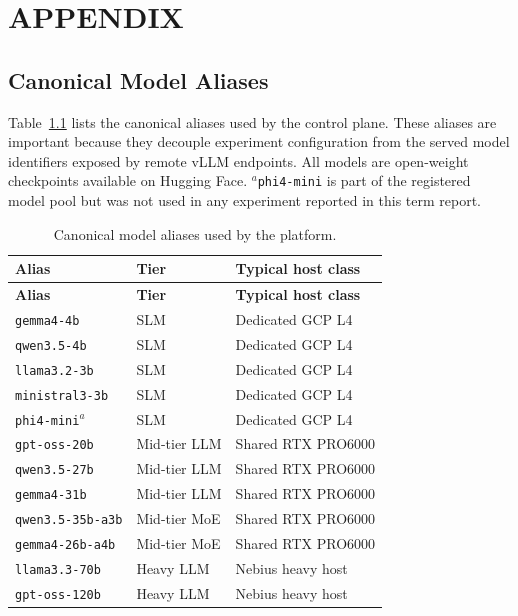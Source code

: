 \appendix
\chapter{APPENDIX}

\section{Canonical Model Aliases}

Table~\ref{tab:appendix-aliases} lists the canonical aliases used by the control plane. These aliases are important because they decouple experiment configuration from the served model identifiers exposed by remote vLLM endpoints. All models are open-weight checkpoints available on Hugging Face. ${}^{a}$\texttt{phi4-mini} is part of the registered model pool but was not used in any experiment reported in this term report.

\begin{longtable}{@{} l l l @{}}
    \caption{Canonical model aliases used by the platform.}
    \label{tab:appendix-aliases} \\
    \toprule
    \textbf{Alias} & \textbf{Tier} & \textbf{Typical host class} \\
    \midrule
    \endfirsthead
    \toprule
    \textbf{Alias} & \textbf{Tier} & \textbf{Typical host class} \\
    \midrule
    \endhead
    \texttt{gemma4-4b} & SLM & Dedicated GCP L4 \\
    \texttt{qwen3.5-4b} & SLM & Dedicated GCP L4 \\
    \texttt{llama3.2-3b} & SLM & Dedicated GCP L4 \\
    \texttt{ministral3-3b} & SLM & Dedicated GCP L4 \\
    \texttt{phi4-mini}${}^{a}$ & SLM & Dedicated GCP L4 \\
    \texttt{gpt-oss-20b} & Mid-tier LLM & Shared RTX PRO6000 \\
    \texttt{qwen3.5-27b} & Mid-tier LLM & Shared RTX PRO6000 \\
    \texttt{gemma4-31b} & Mid-tier LLM & Shared RTX PRO6000 \\
    \texttt{qwen3.5-35b-a3b} & Mid-tier MoE & Shared RTX PRO6000 \\
    \texttt{gemma4-26b-a4b} & Mid-tier MoE & Shared RTX PRO6000 \\
    \texttt{llama3.3-70b} & Heavy LLM & Nebius heavy host \\
    \texttt{gpt-oss-120b} & Heavy LLM & Nebius heavy host \\
    \bottomrule
\end{longtable}

